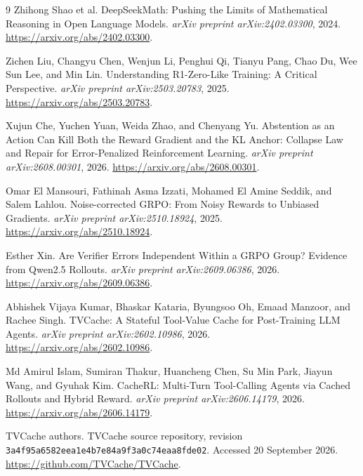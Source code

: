 \documentclass[10pt,letterpaper]{article}
\begin{document}
\begin{thebibliography}{9}
\small
{}
Zhihong Shao et al.
\newblock DeepSeekMath: Pushing the Limits of Mathematical Reasoning in Open Language Models.
\newblock \emph{arXiv preprint arXiv:2402.03300}, 2024.
\newblock \url{https://arxiv.org/abs/2402.03300}.

Zichen Liu, Changyu Chen, Wenjun Li, Penghui Qi, Tianyu Pang, Chao Du, Wee Sun Lee, and Min Lin.
\newblock Understanding R1-Zero-Like Training: A Critical Perspective.
\newblock \emph{arXiv preprint arXiv:2503.20783}, 2025.
\newblock \url{https://arxiv.org/abs/2503.20783}.

Xujun Che, Yuchen Yuan, Weida Zhao, and Chenyang Yu.
\newblock Abstention as an Action Can Kill Both the Reward Gradient and the KL Anchor:
Collapse Law and Repair for Error-Penalized Reinforcement Learning.
\newblock \emph{arXiv preprint arXiv:2608.00301}, 2026.
\newblock \url{https://arxiv.org/abs/2608.00301}.

Omar El Mansouri, Fathinah Asma Izzati, Mohamed El Amine Seddik, and Salem Lahlou.
\newblock Noise-corrected GRPO: From Noisy Rewards to Unbiased Gradients.
\newblock \emph{arXiv preprint arXiv:2510.18924}, 2025.
\newblock \url{https://arxiv.org/abs/2510.18924}.

Esther Xin.
\newblock Are Verifier Errors Independent Within a GRPO Group? Evidence from Qwen2.5 Rollouts.
\newblock \emph{arXiv preprint arXiv:2609.06386}, 2026.
\newblock \url{https://arxiv.org/abs/2609.06386}.

Abhishek Vijaya Kumar, Bhaskar Kataria, Byungsoo Oh, Emaad Manzoor, and Rachee Singh.
\newblock TVCache: A Stateful Tool-Value Cache for Post-Training LLM Agents.
\newblock \emph{arXiv preprint arXiv:2602.10986}, 2026.
\newblock \url{https://arxiv.org/abs/2602.10986}.

Md Amirul Islam, Sumiran Thakur, Huancheng Chen, Su Min Park, Jiayun Wang, and Gyuhak Kim.
\newblock CacheRL: Multi-Turn Tool-Calling Agents via Cached Rollouts and Hybrid Reward.
\newblock \emph{arXiv preprint arXiv:2606.14179}, 2026.
\newblock \url{https://arxiv.org/abs/2606.14179}.

TVCache authors.
\newblock TVCache source repository, revision
\texttt{3a4f95a6582eea1e4b7e84a9f3a0c74eaa8fde02}.
\newblock Accessed 20 September 2026.
\newblock \url{https://github.com/TVCache/TVCache}.
\end{thebibliography}
\end{document}
